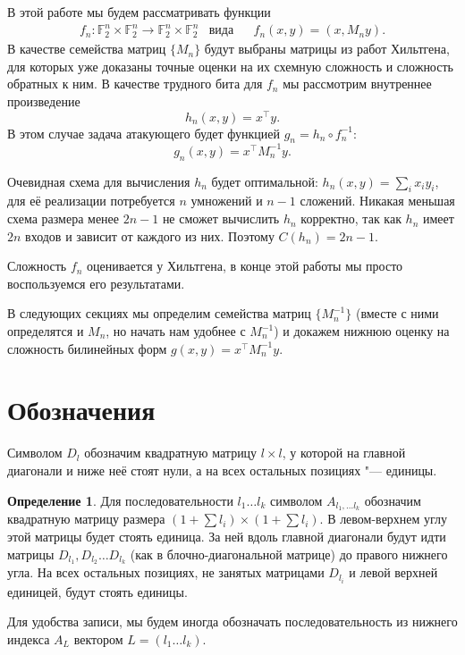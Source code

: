 \documentclass[oneside, a4paper]{article}
\theoremstyle{definition}
\newtheorem{definition}{Определение}
\theoremstyle{remark}
\newcommand\F{\ensuremath{\mathbb F}}
\begin{document}
В этой работе мы будем рассматривать функции
\[
\begin{aligned}
&f_n : \F_2^n \times \F_2^n \to \F_2^n \times \F_2^n
&
\text{вида}&
&
f_n(x, y) = (x, M_n y).&
\end{aligned}
\]
В качестве семейства матриц
$\{M_n\}$ будут выбраны матрицы из работ Хильтгена, для которых уже доказаны
точные оценки на их схемную сложность и сложность обратных к ним. В качестве
трудного бита для $f_n$ мы рассмотрим внутреннее произведение \[
h_n(x, y) = x^\top y.
\]
В этом случае задача атакующего будет функцией $g_n = h_n \circ f_n^{-1}$:
\[
g_n(x, y) = x^\top M_n^{-1} y.
\]

Очевидная схема для вычисления $h_n$ будет оптимальной: $h_n(x, y) = \sum_i x_i
y_i$, для её реализации потребуется $n$ умножений и $n - 1$ сложений. Никакая
меньшая схема размера менее $2n - 1$ не сможет вычислить $h_n$ корректно, так
как $h_n$ имеет $2n$ входов и зависит от каждого из них. Поэтому $C(h_n) = 2n - 1$.

Сложность $f_n$ оценивается у Хильтгена, в конце этой работы мы просто
воспользуемся его результатами.

В следующих секциях мы определим семейства матриц $\{M_n^{-1}\}$ (вместе с ними
определятся и $M_n$, но начать нам удобнее с $M_n^{-1}$) и докажем нижнюю оценку
на сложность билинейных форм $g(x, y) = x^\top M_n^{-1} y$.

\section{Обозначения}


Символом $D_l$ обозначим квадратную матрицу $l \times l$, у которой на главной
диагонали и ниже неё стоят нули, а на всех остальных позициях "--- единицы.

\begin{definition}
Для последовательности $l_1 \dots l_k$ символом $A_{l_1, \dots l_k}$ обозначим
квадратную матрицу размера $(1 + \sum l_i) \times (1 + \sum l_i)$. В левом-верхнем
углу этой матрицы будет стоять единица. За ней вдоль главной диагонали будут идти
матрицы $D_{l_1}, D_{l_2} \dots D_{l_k}$ (как в блочно-диагональной матрице) до
правого нижнего угла. На всех остальных позициях, не занятых матрицами $D_{l_i}$
и левой верхней единицей, будут стоять единицы.
\end{definition}

Для удобства записи, мы будем иногда обозначать последовательность из нижнего
индекса $A_L$ вектором $L = (l_1 \dots l_k)$.
\end{document}
